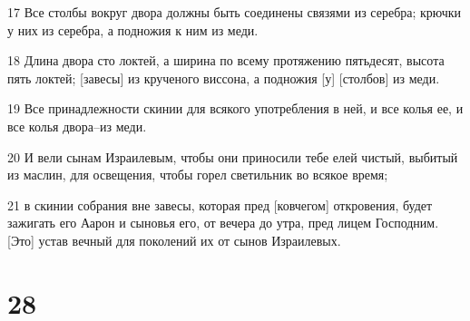 \par 17 Все столбы вокруг двора должны быть соединены связями из серебра; крючки у них из серебра, а подножия к ним из меди.
\par 18 Длина двора сто локтей, а ширина по всему протяжению пятьдесят, высота пять локтей; [завесы] из крученого виссона, а подножия [у] [столбов] из меди.
\par 19 Все принадлежности скинии для всякого употребления в ней, и все колья ее, и все колья двора--из меди.
\par 20 И вели сынам Израилевым, чтобы они приносили тебе елей чистый, выбитый из маслин, для освещения, чтобы горел светильник во всякое время;
\par 21 в скинии собрания вне завесы, которая пред [ковчегом] откровения, будет зажигать его Аарон и сыновья его, от вечера до утра, пред лицем Господним. [Это] устав вечный для поколений их от сынов Израилевых.

\chapter{28}

